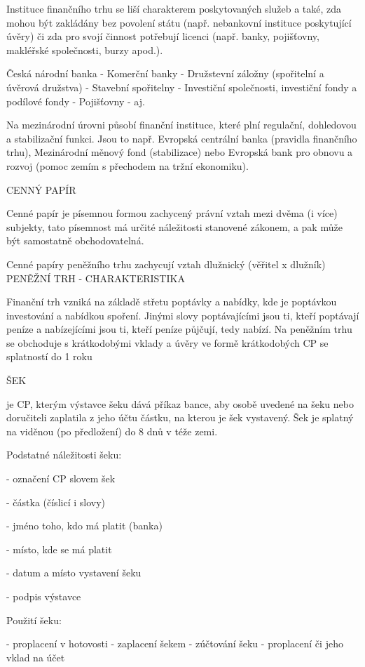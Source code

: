 Instituce finančního trhu se liší charakterem poskytovaných služeb a také, zda mohou být zakládány bez povolení státu
(např. nebankovní instituce poskytující úvěry) či zda pro svojí činnost potřebují licenci (např. banky, pojišťovny,
makléřské společnosti, burzy apod.).

Česká národní banka - Komerční banky - Družstevní záložny (spořitelní a úvěrová družstva) - Stavební spořitelny -
Investiční společnosti, investiční fondy a podílové fondy - Pojišťovny - aj.

Na mezinárodní úrovni působí finanční instituce, které plní regulační, dohledovou a stabilizační funkci. Jsou to např.
Evropská centrální banka (pravidla finančního trhu), Mezinárodní měnový fond (stabilizace) nebo Evropská bank pro
obnovu a rozvoj (pomoc zemím s přechodem na tržní ekonomiku).

CENNÝ PAPÍR

Cenné papír je písemnou formou zachycený právní vztah mezi dvěma (i více) subjekty, tato písemnost má určité
náležitosti stanovené zákonem, a pak může být samostatně obchodovatelná.

Cenné papíry peněžního trhu zachycují vztah dlužnický (věřitel x dlužník)
\newpage
PENĚŽNÍ TRH - CHARAKTERISTIKA

Finanční trh vzniká na základě střetu poptávky a nabídky, kde je poptávkou investování a nabídkou spoření. Jinými slovy
poptávajícími jsou ti, kteří poptávají peníze a nabízejícími jsou ti, kteří peníze půjčují, tedy nabízí. Na peněžním trhu se
obchoduje s krátkodobými vklady a úvěry ve formě krátkodobých CP se splatností do 1 roku

ŠEK

je CP, kterým výstavce šeku dává příkaz bance, aby osobě uvedené na šeku nebo doručiteli zaplatila z jeho účtu částku,
na kterou je šek vystavený. Šek je splatný na viděnou (po předložení) do 8 dnů v téže zemi.

Podstatné náležitosti šeku:

- označení CP slovem šek

- částka (číslicí i slovy)

- jméno toho, kdo má platit (banka)

- místo, kde se má platit

- datum a místo vystavení šeku

- podpis výstavce

Použití šeku:

- proplacení v hotovosti - zaplacení šekem - zúčtování šeku - proplacení či jeho vklad na účet

